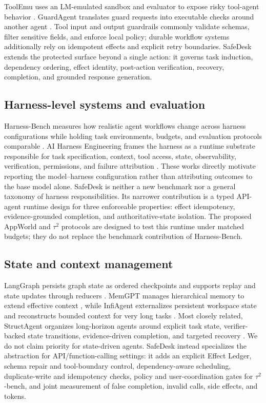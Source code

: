 \documentclass[10pt]{article}
\newcommand{\safedesk}{SafeDesk}
\begin{document}
ToolEmu uses an LM-emulated sandbox and evaluator to expose risky tool-agent
behavior \citep{ruan2024toolemu}. GuardAgent translates guard requests into
executable checks around another agent \citep{xiang2025guardagent}. Tool input and
output guardrails commonly validate schemas, filter sensitive fields, and enforce
local policy; durable workflow systems additionally rely on idempotent effects and
explicit retry boundaries. \safedesk{} extends the protected surface beyond a
single action: it governs task induction, dependency ordering, effect identity,
post-action verification, recovery, completion, and grounded response generation.

\subsection{Harness-level systems and evaluation}

Harness-Bench measures how realistic agent workflows change across harness
configurations while holding task environments, budgets, and evaluation protocols
comparable \citep{yao2026harnessbench}. AI Harness Engineering frames the harness
as a runtime substrate responsible for task specification, context, tool access,
state, observability, verification, permissions, and failure attribution
\citep{zhong2026aiharness}. These works directly motivate reporting the
model--harness configuration rather than attributing outcomes to the base model
alone. SafeDesk is neither a new benchmark nor a general taxonomy of harness
responsibilities. Its narrower contribution is a typed API-agent runtime design
for three enforceable properties: effect idempotency, evidence-grounded completion,
and authoritative-state isolation. The proposed AppWorld and $\tau^2$ protocols
are designed to test this runtime under matched budgets; they do not replace the
benchmark contribution of Harness-Bench.

\subsection{State and context management}

LangGraph persists graph state as ordered checkpoints and supports replay and
state updates through reducers \citep{langgraph2026persistence}. MemGPT manages
hierarchical memory to extend effective context \citep{packer2023memgpt}, while
InfiAgent externalizes persistent workspace state and reconstructs bounded context
for very long tasks \citep{yu2026infiagent}. Most closely related, StructAgent
organizes long-horizon agents around explicit task state, verifier-backed state
transitions, evidence-driven completion, and targeted recovery
\citep{wu2026structagent}. We do not claim priority for state-driven agents.
\safedesk{} instead specializes the abstraction for API/function-calling settings:
it adds an explicit Effect Ledger, schema repair and tool-boundary control,
dependency-aware scheduling, duplicate-write and idempotency checks, policy and
user-coordination gates for $\tau^2$-bench, and joint measurement of false
completion, invalid calls, side effects, and tokens.
\end{document}
